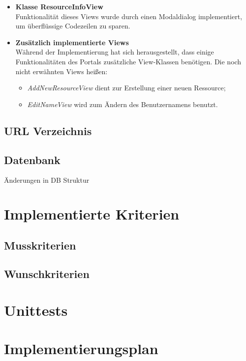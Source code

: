 \documentclass[parskip=full,11pt]{scrartcl}
\begin{document}
\begin{itemize}
\item \textbf{Klasse ResourceInfoView}\\
Funktionalität dieses Views wurde durch einen Modaldialog implementiert, um überflüssige Codezeilen zu sparen.
\newpage
\item \textbf{Zusätzlich implementierte Views}\\
Während der Implementierung hat sich herausgestellt, dass einige Funktionalitäten des Portals zusätzliche View-Klassen benötigen. Die noch nicht erwähnten Views heißen:
\begin{itemize}
\item \textit{AddNewResourceView} dient zur Erstellung einer neuen Ressource;
\item \textit{EditNameView} wird zum Ändern des Benutzernamens benutzt.
\end{itemize} 
\end{itemize}

 \subsection{URL Verzeichnis}

 
\subsection{Datenbank}
Änderungen in DB Struktur\\


 \section{Implementierte Kriterien}
 \subsection{Musskriterien}
 
 \subsection{Wunschkriterien}
 
 
 \section{Unittests}
\section{Implementierungsplan}
 \newpage
{}
\printglossary	
	
 
\end{document}
